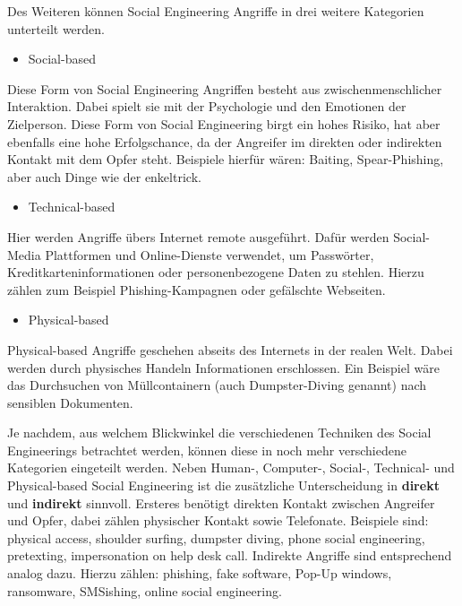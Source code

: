 Des Weiteren können Social Engineering Angriffe in drei weitere Kategorien unterteilt werden.
\begin{itemize}
    \item Social-based
\end{itemize}
Diese Form von Social Engineering Angriffen besteht aus zwischenmenschlicher Interaktion.
Dabei spielt sie mit der Psychologie und den Emotionen der Zielperson.
Diese Form von Social Engineering birgt ein hohes Risiko, hat aber ebenfalls eine hohe Erfolgschance, da der Angreifer im direkten oder indirekten Kontakt mit dem Opfer steht.
Beispiele hierfür wären: Baiting, Spear-Phishing, aber auch Dinge wie der \gls{enkeltrick}.

\begin{itemize}
    \item Technical-based
\end{itemize}
Hier werden Angriffe übers Internet remote ausgeführt.
Dafür werden Social-Media Plattformen und Online-Dienste verwendet, um Passwörter, Kreditkarteninformationen oder personenbezogene Daten zu stehlen.
Hierzu zählen zum Beispiel Phishing-Kampagnen oder gefälschte Webseiten.

\begin{itemize}
    \item Physical-based
\end{itemize}
Physical-based Angriffe geschehen abseits des Internets in der realen Welt.
Dabei werden durch physisches Handeln Informationen erschlossen.
Ein Beispiel wäre das Durchsuchen von Müllcontainern (auch Dumpster-Diving genannt) nach sensiblen Dokumenten.


Je nachdem, aus welchem Blickwinkel die verschiedenen Techniken des Social Engineerings betrachtet werden, können diese in noch mehr verschiedene Kategorien eingeteilt werden.
Neben Human-, Computer-, Social-, Technical- und Physical-based Social Engineering ist die zusätzliche Unterscheidung in \textbf{direkt} und \textbf{indirekt} sinnvoll.
Ersteres benötigt direkten Kontakt zwischen Angreifer und Opfer, dabei zählen physischer Kontakt sowie Telefonate.
Beispiele sind: physical access, shoulder surfing, dumpster diving, phone social engineering, pretexting, impersonation on help desk call.
Indirekte Angriffe sind entsprechend analog dazu.
Hierzu zählen: phishing, fake software, Pop-Up windows, ransomware, SMSishing, online social engineering.

